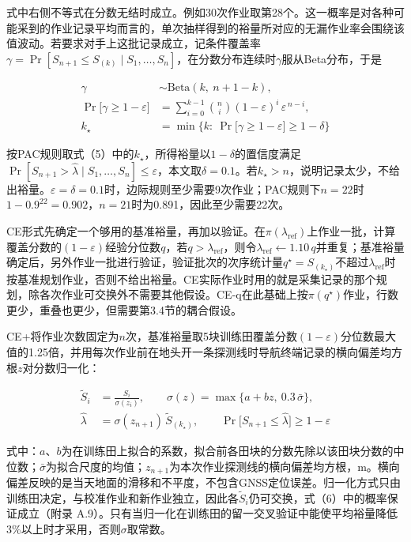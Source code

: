 \documentclass[preprint,12pt,number,sort&compress]{elsarticle}
\begin{document}
式中右侧不等式在分数无结时成立。例如30次作业取第28个。这一概率是对各种可能采到的作业记录平均而言的，单次抽样得到的裕量所对应的无漏作业率会围绕该值波动。若要求对手上这批记录成立，记条件覆盖率\(\gamma=\Pr[S_{n+1}\le S_{(k)}\mid S_1,\dots,S_n]\)，在分数分布连续时\(\gamma\)服从Beta分布，于是

\begin{equation}
\begin{aligned}
\gamma&\sim\mathrm{Beta}(k,\ n+1-k),\\
\Pr\big[\gamma\ge1-\varepsilon\big]&=\sum_{i=0}^{k-1}\binom{n}{i}(1-\varepsilon)^{i}\,\varepsilon^{\,n-i},\\
k_\star&=\min\Big\{k:\ \Pr\big[\gamma\ge1-\varepsilon\big]\ge1-\delta\Big\}
\end{aligned}
\end{equation}

按PAC规则取式（5）中的\(k_\star\)，所得裕量以\(1-\delta\)的置信度满足\(\Pr[S_{n+1}>\hat\lambda\mid S_1,\dots,S_n]\le\varepsilon\)，本文取\(\delta=0.1\)。若\(k_\star>n\)，说明记录太少，不给出裕量。\(\varepsilon=\delta=0.1\)时，边际规则至少需要9次作业；PAC规则下\(n=22\)时\(1-0.9^{22}=0.902\)，\(n=21\)时为0.891，因此至少需要22次。

CE形式先确定一个够用的基准裕量，再加以验证。在\(\pi(\lambda_\mathrm{ref})\)上作业一批，计算覆盖分数的\((1-\varepsilon)\)经验分位数\(q\)，若\(q>\lambda_\mathrm{ref}\)，则令\(\lambda_\mathrm{ref}\leftarrow1.10\,q\)并重复；基准裕量确定后，另外作业一批进行验证，验证批次的次序统计量\(q^\star=S_{(k_\star)}\)不超过\(\lambda_\mathrm{ref}\)时按基准规划作业，否则不给出裕量。CE实际作业时用的就是采集记录的那个规划，除各次作业可交换外不需要其他假设。CE-q在此基础上按\(\pi(q^\star)\)作业，行数更少，重叠也更少，但需要第3.4节的耦合假设。

CE+将作业次数固定为\(n\)次，基准裕量取5块训练田覆盖分数\((1-\varepsilon)\)分位数最大值的1.25倍，并用每次作业前在地头开一条探测线时导航终端记录的横向偏差均方根\(z\)对分数归一化：

\begin{equation}
\begin{aligned}
\tilde S_i&=\frac{S_i}{\sigma(z_i)},\qquad \sigma(z)=\max\big\{a+bz,\ 0.3\,\bar\sigma\big\},\\
\hat\lambda&=\sigma(z_{n+1})\,\tilde S_{(k_\star)},\qquad \Pr\big[S_{n+1}\le\hat\lambda\big]\ge1-\varepsilon
\end{aligned}
\end{equation}

式中：\(a\)、\(b\)为在训练田上拟合的系数，拟合前各田块的分数先除以该田块分数的中位数；\(\bar\sigma\)为拟合尺度的均值；\(z_{n+1}\)为本次作业探测线的横向偏差均方根，m。横向偏差反映的是当天地面的滑移和不平度，不包含GNSS定位误差。归一化方式只由训练田决定，与校准作业和新作业独立，因此各\(\tilde S_i\)仍可交换，式（6）中的概率保证成立（附录 A.9）。只有当归一化在训练田的留一交叉验证中能使平均裕量降低3\%以上时才采用，否则\(\sigma\)取常数。
\end{document}
